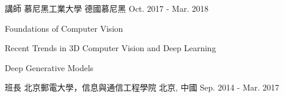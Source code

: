 


\begin{cventries}


\cventry
{講師} %
{慕尼黑工業大學} %
{德國慕尼黑} %
{Oct. 2017 - Mar. 2018} %
{ %
\begin{cvitems}
\item {Foundations of Computer Vision}
\item {Recent Trends in 3D Computer Vision and Deep Learning}
\item {Deep Generative Models}
\end{cvitems}
}

\cventry
{班長} %
{北京郵電大學，信息與通信工程學院} %
{北京, 中國} %
{Sep. 2014 - Mar. 2017} %
{
}


\end{cventries}
